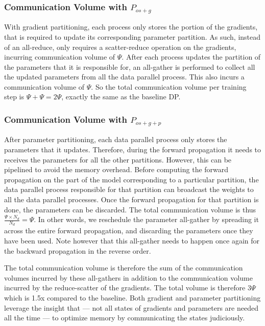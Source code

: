 \subsubsection{Communication Volume with $P_{os+g}$} 
With gradient partitioning, each process only stores the portion of the gradients, that is required to update its corresponding parameter partition. As such, instead of an all-reduce, \name only requires a scatter-reduce operation on the gradients, incurring communication volume of $\Psi$.  After each process updates the partition of the parameters that it is responsible for, an all-gather is performed to collect all the updated parameters from all the data parallel process. This also incurs a communication volume of $\Psi$. So the total communication volume per training step is $\Psi+\Psi= 2\Psi$, exactly the same as the baseline DP.

\subsubsection{Communication Volume with $P_{os+g+p}$ } 
After parameter partitioning, each data parallel process only stores the parameters that it updates. Therefore, during the forward propagation it needs to receives the parameters for all the other partitions. However, this can be pipelined to avoid the memory overhead. Before computing the forward propagation on the part of the model corresponding to a particular partition, the data parallel process responsible for that partition can broadcast the weights to all the data parallel processes. Once the forward propagation for that partition is done, the parameters can be discarded. The total communication volume is thus $\frac{\Psi \times N_d}{N_d} = \Psi$. In other words, we reschedule the parameter all-gather by spreading it across the entire forward propagation, and discarding the parameters once they have been used. Note however that this all-gather needs to happen once again for the backward propagation in the reverse order. 

The total communication volume is therefore the sum of the communication volumes incurred by these all-gathers in addition to the communication volume incurred by the reduce-scatter of the gradients. The total volume is therefore $3\Psi$ which is 1.5x compared to the baseline.   Both gradient and parameter partitioning leverage the insight that --- not all states of gradients and parameters are needed all the time --- to optimize memory by communicating the states judiciously. 


